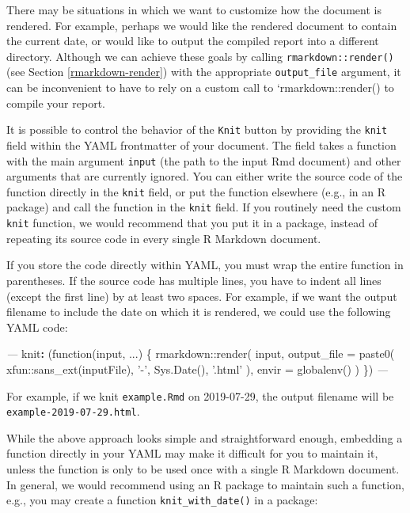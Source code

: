 \documentclass[
  11pt,
]{krantz}
\newenvironment{Shaded}{\begin{snugshade}}{\end{snugshade}}
\newcommand{\AttributeTok}[1]{\textcolor[rgb]{0.61,0.61,0.61}{#1}}
\newcommand{\FunctionTok}[1]{\textcolor[rgb]{0,0,0}{#1}}
\newcommand{\KeywordTok}[1]{\textcolor[rgb]{0.27,0.27,0.27}{\textbf{#1}}}
\newcommand{\PreprocessorTok}[1]{\textcolor[rgb]{0.37,0.37,0.37}{\textit{#1}}}
\begin{document}
There may be situations in which we want to customize how the document is rendered. For example, perhaps we would like the rendered document to contain the current date, or would like to output the compiled report into a different directory. Although we can achieve these goals by calling \texttt{rmarkdown::render()} (see Section \ref{rmarkdown-render}) with the appropriate \texttt{output\_file} argument, it can be inconvenient to have to rely on a custom call to `rmarkdown::render() to compile your report.

It is possible to control the behavior of the \texttt{Knit} button by providing the \texttt{knit} field within the YAML frontmatter of your document. The field takes a function with the main argument \texttt{input} (the path to the input Rmd document) and other arguments that are currently ignored. You can either write the source code of the function directly in the \texttt{knit} field, or put the function elsewhere (e.g., in an R package) and call the function in the \texttt{knit} field. If you routinely need the custom \texttt{knit} function, we would recommend that you put it in a package, instead of repeating its source code in every single R Markdown document.

If you store the code directly within YAML, you must wrap the entire function in parentheses. If the source code has multiple lines, you have to indent all lines (except the first line) by at least two spaces. For example, if we want the output filename to include the date on which it is rendered, we could use the following YAML code:

\begin{Shaded}
\begin{Highlighting}[]
\PreprocessorTok{---}
\FunctionTok{knit}\KeywordTok{:}\AttributeTok{ (function(input, ...) \{}
\AttributeTok{    rmarkdown::render(}
\AttributeTok{      input,}
\AttributeTok{      output_file = paste0(}
\AttributeTok{        xfun::sans_ext(inputFile), '-', Sys.Date(), '.html'}
\AttributeTok{      ),}
\AttributeTok{      envir = globalenv()}
\AttributeTok{    )}
\AttributeTok{  \})}
\PreprocessorTok{---}
\end{Highlighting}
\end{Shaded}

For example, if we knit \texttt{example.Rmd} on 2019-07-29, the output filename will be \texttt{example-2019-07-29.html}.

While the above approach looks simple and straightforward enough, embedding a function directly in your YAML may make it difficult for you to maintain it, unless the function is only to be used once with a single R Markdown document. In general, we would recommend using an R package to maintain such a function, e.g., you may create a function \texttt{knit\_with\_date()} in a package:
\end{document}
